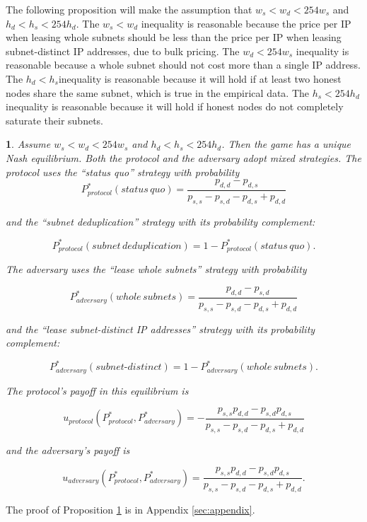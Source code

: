 \documentclass[english]{mrl}
\theoremstyle{plain}
\newtheorem{prop}{\protect\propositionname}
\providecommand{\propositionname}{Proposition}
\begin{document}
The following proposition will make the assumption that $w_{s}<w_{d}<254w_{s}$
and $h_{d}<h_{s}<254h_{d}$. The $w_{s}<w_{d}$ inequality is reasonable
because the price per IP when leasing whole subnets should be less
than the price per IP when leasing subnet-distinct IP addresses, due
to bulk pricing. The $w_{d}<254w_{s}$ inequality is reasonable because
a whole subnet should not cost more than a single IP address. The
$h_{d}<h_{s}$inequality is reasonable because it will hold if at
least two honest nodes share the same subnet, which is true in the
empirical data. The $h_{s}<254h_{d}$ inequality is reasonable because
it will hold if honest nodes do not completely saturate their subnets.
\begin{prop}
\label{prop:1}Assume $w_{s}<w_{d}<254w_{s}$ and $h_{d}<h_{s}<254h_{d}$.
Then the game has a unique Nash equilibrium. Both the protocol and
the adversary adopt mixed strategies. The protocol uses the ``status
quo'' strategy with probability
\begin{equation}
P_{protocol}^{*}(status\,quo)=\dfrac{p_{d,d}-p_{d,s}}{p_{s,s}-p_{s,d}-p_{d,s}+p_{d,d}}\label{eq:P_protocol_status_quo}
\end{equation}

and the ``subnet deduplication'' strategy with its probability complement:

\begin{equation}
P_{protocol}^{*}(subnet\,deduplication)=1-P_{protocol}^{*}(status\,quo).
\end{equation}

The adversary uses the ``lease whole subnets'' strategy with probability

\begin{equation}
P_{adversary}^{*}(whole\,subnets)=\dfrac{p_{d,d}-p_{s,d}}{p_{s,s}-p_{s,d}-p_{d,s}+p_{d,d}}\label{eq:P_adversary_whole_subnets}
\end{equation}

and the ``lease subnet-distinct IP addresses'' strategy with its
probability complement:

\begin{equation}
P_{adversary}^{*}(subnet\textrm{-}distinct)=1-P_{adversary}^{*}(whole\,subnets).
\end{equation}

The protocol's payoff in this equilibrium is

\begin{equation}
u_{protocol}\left(P_{protocol}^{*},P_{adversary}^{*}\right)=-\dfrac{p_{s,s}p_{d,d}-p_{s,d}p_{d,s}}{p_{s,s}-p_{s,d}-p_{d,s}+p_{d,d}}
\end{equation}

and the adversary's payoff is

\begin{equation}
u_{adversary}\left(P_{protocol}^{*},P_{adversary}^{*}\right)=\dfrac{p_{s,s}p_{d,d}-p_{s,d}p_{d,s}}{p_{s,s}-p_{s,d}-p_{d,s}+p_{d,d}}.\label{eq:u_adversary}
\end{equation}
\end{prop}
The proof of Proposition \ref{prop:1} is in Appendix \ref{sec:appendix}.
\end{document}

